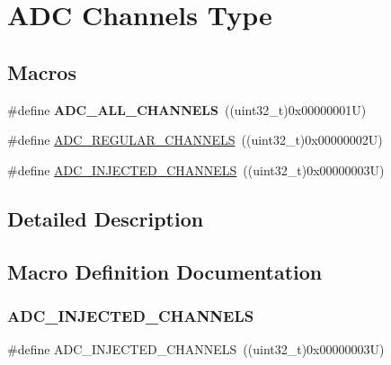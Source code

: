 \hypertarget{group___a_d_c__channels__type}{}\section{A\+DC Channels Type}
\label{group___a_d_c__channels__type}
\subsection*{Macros}
\begin{DoxyCompactItemize}
\item 
\mbox{\label{group___a_d_c__channels__type_ga06d28ef2d0b9e110f69a35e4793f066e}} 
\#define {\bfseries A\+D\+C\+\_\+\+A\+L\+L\+\_\+\+C\+H\+A\+N\+N\+E\+LS}~((uint32\+\_\+t)0x00000001\+U)
\item 
\#define \mbox{\hyperlink{group___a_d_c__channels__type_gad47a927eded315f3dcb21df51ff778fd}{A\+D\+C\+\_\+\+R\+E\+G\+U\+L\+A\+R\+\_\+\+C\+H\+A\+N\+N\+E\+LS}}~((uint32\+\_\+t)0x00000002\+U)
\item 
\#define \mbox{\hyperlink{group___a_d_c__channels__type_ga6444b1539e8503ef3a2496ccf7eeb9fd}{A\+D\+C\+\_\+\+I\+N\+J\+E\+C\+T\+E\+D\+\_\+\+C\+H\+A\+N\+N\+E\+LS}}~((uint32\+\_\+t)0x00000003\+U)
\end{DoxyCompactItemize}


\subsection{Detailed Description}


\subsection{Macro Definition Documentation}
\mbox{\label{group___a_d_c__channels__type_ga6444b1539e8503ef3a2496ccf7eeb9fd}} 
\subsubsection{\texorpdfstring{ADC\_INJECTED\_CHANNELS}{ADC\_INJECTED\_CHANNELS}}
{\footnotesize\ttfamily \#define A\+D\+C\+\_\+\+I\+N\+J\+E\+C\+T\+E\+D\+\_\+\+C\+H\+A\+N\+N\+E\+LS~((uint32\+\_\+t)0x00000003\+U)}

